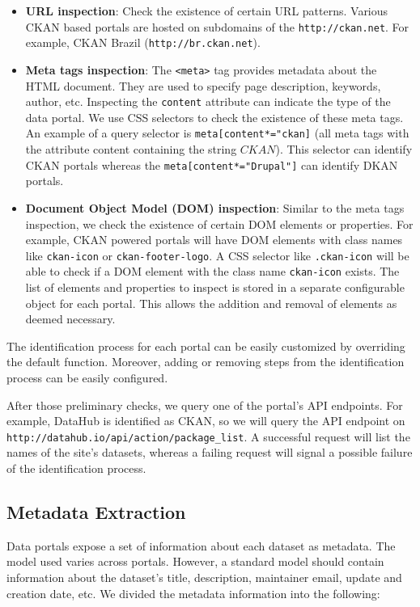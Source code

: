 \documentclass[runningheads,a4paper]{llncs}
\begin{document}
\begin{itemize}
  \item \textbf{URL inspection}: Check the existence of certain URL patterns. Various CKAN based portals are hosted on subdomains of the \texttt{http://ckan.net}. For example, CKAN Brazil (\texttt{http://br.ckan.net}).
  \item \textbf{Meta tags inspection}: The \texttt{<meta>} tag provides metadata about the HTML document. They are used to specify page description, keywords, author, etc. Inspecting the \texttt{content} attribute can indicate the type of the data portal. We use CSS selectors to check the existence of these meta tags. An example of a query selector is \texttt{meta[content*="ckan]} (all meta tags with the attribute content containing the string $CKAN$). This selector can identify CKAN portals whereas the \texttt{meta[content*="Drupal"]} can identify DKAN portals.
  \item \textbf{Document Object Model (DOM) inspection}: Similar to the meta tags inspection, we check the existence of certain DOM elements or properties. For example, CKAN powered portals will have DOM elements with class names like \texttt{ckan-icon} or \texttt{ckan-footer-logo}. A CSS selector like \texttt{.ckan-icon} will be able to check if a DOM element with the class name \texttt{ckan-icon} exists.
  The list of elements and properties to inspect is stored in a separate configurable object for each portal. This allows the addition and removal of elements as deemed necessary.
\end{itemize}

The identification process for each portal can be easily customized by overriding the default function. Moreover, adding or removing steps from the identification process can be easily configured.

After those preliminary checks, we query one of the portal's API endpoints. For example, DataHub is identified as CKAN, so we will query the API endpoint on \texttt{http://datahub.io/api/action/package\_list}. A successful request will list the names of the site's datasets, whereas a failing request will signal a possible failure of the identification process.

\subsection{Metadata Extraction}

Data portals expose a set of information about each dataset as metadata. The model used varies across portals. However, a standard model should contain information about the dataset's title, description, maintainer email, update and creation date, etc. We divided the metadata information into the following:
\end{document}

